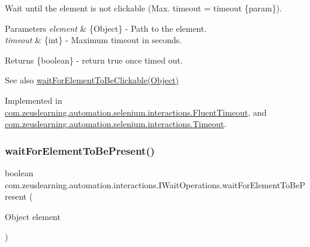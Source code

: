 Wait until the element is not clickable (Max. timeout = timeout \{param\}).


\begin{DoxyParams}{Parameters}
{\em element} & \{Object\} -\/ Path to the element. \\
\hline
{\em timeout} & \{int\} -\/ Maximum timeout in seconds.\\
\hline
\end{DoxyParams}
\begin{DoxyReturn}{Returns}
\{boolean\} -\/ return {\ttfamily true} once timed out.
\end{DoxyReturn}
\begin{DoxySeeAlso}{See also}
\hyperlink{interfacecom_1_1zeuslearning_1_1automation_1_1interactions_1_1IWaitOperations_a224899aff622d5bbc4f7e76761413dc9}{wait\+For\+Element\+To\+Be\+Clickable(\+Object)} 
\end{DoxySeeAlso}


Implemented in \hyperlink{classcom_1_1zeuslearning_1_1automation_1_1selenium_1_1interactions_1_1FluentTimeout_adce608907ac37820819c4e4f7120c733}{com.\+zeuslearning.\+automation.\+selenium.\+interactions.\+Fluent\+Timeout}, and \hyperlink{classcom_1_1zeuslearning_1_1automation_1_1selenium_1_1interactions_1_1Timeout_a704a4c52aeb1fc87555e0f17b2a86cfe}{com.\+zeuslearning.\+automation.\+selenium.\+interactions.\+Timeout}.

\hypertarget{interfacecom_1_1zeuslearning_1_1automation_1_1interactions_1_1IWaitOperations_a37e642af4e56132b564fa67e34e973d4}{}\label{interfacecom_1_1zeuslearning_1_1automation_1_1interactions_1_1IWaitOperations_a37e642af4e56132b564fa67e34e973d4} 
\subsubsection{\texorpdfstring{wait\+For\+Element\+To\+Be\+Present()}{waitForElementToBePresent()}\hspace{0.1cm}{\footnotesize\ttfamily [1/2]}}
{\footnotesize\ttfamily boolean com.\+zeuslearning.\+automation.\+interactions.\+I\+Wait\+Operations.\+wait\+For\+Element\+To\+Be\+Present (\begin{DoxyParamCaption}\item[{Object}]{element }\end{DoxyParamCaption})}

